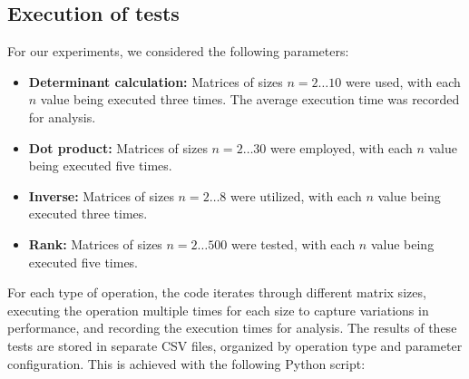 \subsection{Execution of tests}
For our experiments, we considered the following parameters:
\begin{itemize}
    \item \textbf{Determinant calculation:} Matrices of sizes $n = 2 \dots 10$ were used, with each $n$ value being executed three times. The average execution time was recorded for analysis.
    \item \textbf{Dot product:} Matrices of sizes $n = 2 \dots 30$ were employed, with each $n$ value being executed five times.
    \item \textbf{Inverse:} Matrices of sizes $n = 2 \dots 8$ were utilized, with each $n$ value being executed three times.
    \item \textbf{Rank:} Matrices of sizes $n = 2 \dots 500$ were tested, with each $n$ value being executed five times.
\end{itemize}
\vfill
For each type of operation, the code iterates through different matrix sizes, executing the operation multiple times for each size to capture variations in performance, and recording the execution times for analysis. The results of these tests are stored in separate CSV files, organized by operation type and parameter configuration. This is achieved with the following Python script:
\pagebreak
